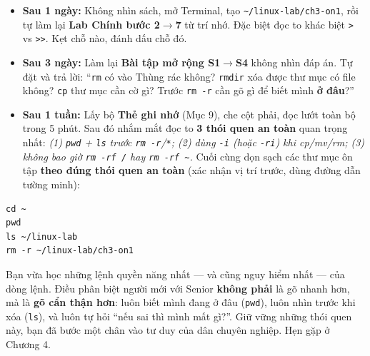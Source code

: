 \documentclass[12pt,a4paper]{article}
\newcommand{\cmd}[1]{\texttt{#1}}
\begin{document}
\begin{itemize}[leftmargin=1.4em]
\item \textbf{Sau 1 ngày:} Không nhìn sách, mở Terminal, tạo \cmd{\textasciitilde/linux-lab/ch3-on1}, rồi tự làm lại \textbf{Lab Chính bước 2$\rightarrow$7} từ trí nhớ. Đặc biệt đọc to khác biệt \cmd{>} vs \cmd{>>}. Kẹt chỗ nào, đánh dấu chỗ đó.
\item \textbf{Sau 3 ngày:} Làm lại \textbf{Bài tập mở rộng S1$\rightarrow$S4} không nhìn đáp án. Tự đặt và trả lời: ``\cmd{rm} có vào Thùng rác không? \cmd{rmdir} xóa được thư mục có file không? \cmd{cp} thư mục cần cờ gì? Trước \cmd{rm -r} cần gõ gì để biết mình \textbf{ở đâu}?''
\item \textbf{Sau 1 tuần:} Lấy bộ \textbf{Thẻ ghi nhớ} (Mục 9), che cột phải, đọc lướt toàn bộ trong 5 phút. Sau đó nhắm mắt đọc to \textbf{3 thói quen an toàn} quan trọng nhất: \textit{(1) \cmd{pwd} + \cmd{ls} trước \cmd{rm -r}/\cmd{*}; (2) dùng \cmd{-i} (hoặc \cmd{-ri}) khi cp/mv/rm; (3) không bao giờ \cmd{rm -rf /} hay \cmd{rm -rf \textasciitilde{}}.} Cuối cùng dọn sạch các thư mục ôn tập \textbf{theo đúng thói quen an toàn} (xác nhận vị trí trước, dùng đường dẫn tường minh):
\end{itemize}

\begin{Verbatim}
cd ~
pwd
ls ~/linux-lab
rm -r ~/linux-lab/ch3-on1
\end{Verbatim}

\begin{seniorbox}[title={Lời nhắn cuối chương}]
Bạn vừa học những lệnh quyền năng nhất --- và cũng nguy hiểm nhất --- của dòng lệnh. Điều phân biệt người mới với Senior \textbf{không phải} là gõ nhanh hơn, mà là \textbf{gõ cẩn thận hơn}: luôn biết mình đang ở đâu (\cmd{pwd}), luôn nhìn trước khi xóa (\cmd{ls}), và luôn tự hỏi ``nếu sai thì mình mất gì?''. Giữ vững những thói quen này, bạn đã bước một chân vào tư duy của dân chuyên nghiệp. Hẹn gặp ở Chương 4.
\end{seniorbox}
\end{document}
